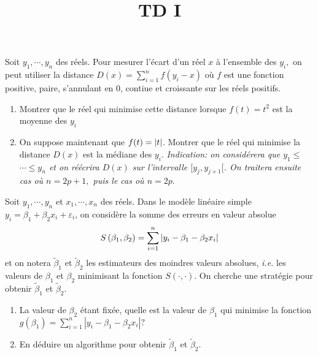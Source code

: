 \documentclass{td_um}
\title{TD I}
\providecommand{\1}{\mathds{1}}
\begin{document}
\maketitle


\exo{} 
Soit $y_{1}, \cdots, y_{n}$ des réels. Pour mesurer l'écart d'un réel $x$ à l'ensemble des $y_{i},$ on peut utiliser la distance $D(x)=\sum_{i=1}^{n} f\left(y_{i}-x\right)$ où $f$ est une fonction positive, paire, s'annulant en 0, contiue et croissante sur les réels positifs.
\begin{enumerate}
    \item Montrer que le réel qui minimise cette distance lorsque $f(t)=t^{2}$ est la moyenne des $y_{i}$
    \item On suppose maintenant que $f(t)=\left\lvert t\right\rvert$. Montrer que le réel qui minimise la distance $D(x)$ est la médiane des $y_{i}$. {\it Indication: on considérera que $y_{1} \leq$ $\cdots \leq y_{n}$ et on réécrira $D(x)$ sur l'intervalle $[y_{j}, y_{j+1}[$. On traitera ensuite cas où $n=2 p+1,$ puis le cas où $n=2 p$}.

\end{enumerate}

\exo{} Soit $y_{1}, \cdots, y_{n}$ et $x_{1}, \cdots, x_{n}$ des réels. Dans le modèle linéaire simple $y_{i}=\beta_{1}+\beta_{2} x_{i}+\varepsilon_{i}$, on considère la somme des erreurs en valeur absolue
\[
    S\left(\beta_{1}, \beta_{2}\right)=\sum_{i=1}^{n}\left\lvert y_{i}-\beta_{1}-\beta_{2} x_{i}\right\rvert
\]
et on notera $\tilde{\beta}_{1}$ et $\tilde{\beta}_{2}$ les estimateurs des moindres valeurs absolues, \textit{i.e.} les valeurs de $\beta_{1}$ et $\beta_{2}$ minimisant la fonction $S(\cdot, \cdot)$. On cherche une stratégie pour obtenir $\tilde{\beta}_{1}$ et $\tilde{\beta}_{2}$.
\begin{enumerate}
 \item La valeur de $\beta_{2}$ étant fixée, quelle est la valeur de $\beta_{1}$ qui minimise la fonction $g\left(\beta_{1}\right)=\sum_{i=1}^{n}\left|y_{i}-\beta_{1}-\beta_{2} x_{i}\right| ?$
 \item En déduire un algorithme pour obtenir $\tilde{\beta}_{1}$ et $\tilde{\beta}_{2}$.
\end{enumerate}
\end{document}
